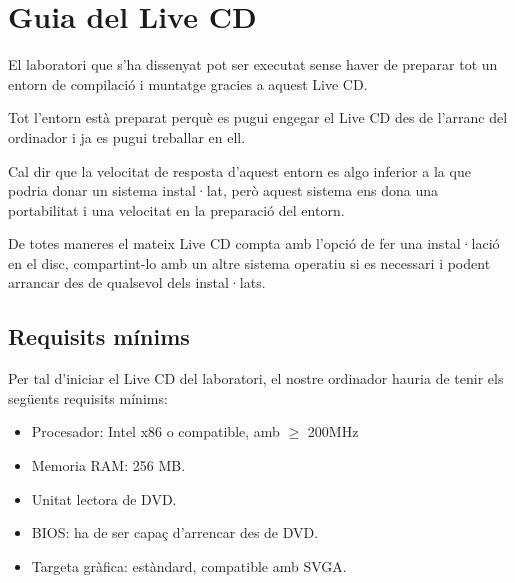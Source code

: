 
\chapter{Guia del Live CD}\label{cap:cd_gui}


\ifpdf
    \graphicspath{{6_live_cd_guide/figures/PNG/}{6_live_cd_guide/figures/PDF/}{6_live_cd_guide/figures/}}
\else
    \graphicspath{{6_live_cd_guide/figures/EPS/}{6_live_cd_guide/figures/}}
\fi



El laboratori que s'ha dissenyat pot ser executat sense haver de preparar tot un entorn de compilació i muntatge gracies a aquest Live CD.
	
Tot l'entorn està preparat perquè es pugui engegar el Live CD des de l'arranc del ordinador i ja es pugui treballar en ell.
	
Cal dir que la velocitat de resposta d'aquest entorn es algo inferior a la que podria donar un sistema instal·lat, però aquest sistema ens dona una portabilitat i una velocitat en la preparació del entorn.
	
De totes maneres el mateix Live CD compta amb l'opció de fer una instal·lació en el disc, compartint-lo amb un altre sistema operatiu si es necessari i podent arrancar des de qualsevol dels instal·lats.
\section{Requisits mínims}
Per tal d'iniciar el Live CD del laboratori, el nostre ordinador hauria de tenir els següents requisits mínims:
\begin{itemize}
	\item Procesador: Intel x86 o compatible, amb $\geq$ 200MHz
	\item Memoria RAM: 256 MB.
	\item Unitat lectora de DVD.
	\item BIOS: ha de ser capaç d'arrencar des de DVD.
	\item Targeta gràfica: estàndard, compatible amb SVGA.
\end{itemize}



